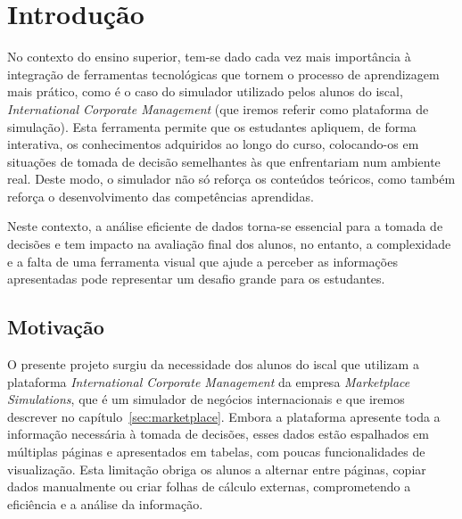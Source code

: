 

\chapter{Introdução}
\label{ch:introducao}

No contexto do ensino superior, tem-se dado cada vez mais importância à integração de ferramentas tecnológicas que tornem o processo de aprendizagem mais prático, como é o caso do simulador utilizado pelos alunos do \gls{iscal}, \textit{International Corporate Management} \cite{MarketplaceSim_2025} (que iremos referir como plataforma de simulação). Esta ferramenta permite que os estudantes apliquem, de forma interativa, os conhecimentos adquiridos ao longo do curso, colocando-os em situações de tomada de decisão semelhantes às que enfrentariam num ambiente real. Deste modo, o simulador não só reforça os conteúdos teóricos, como também reforça o desenvolvimento das competências aprendidas. 

Neste contexto, a análise eficiente de dados torna-se essencial para a tomada de decisões e tem impacto na avaliação final dos alunos, no entanto, a complexidade e a falta de uma ferramenta visual que ajude a perceber as informações apresentadas pode representar um desafio grande para os estudantes.

\section{Motivação}

O presente projeto surgiu da necessidade dos alunos do \gls{iscal} que utilizam a plataforma \textit{International Corporate Management} da empresa \textit{Marketplace Simulations}, que é um simulador de negócios internacionais e que iremos descrever no capítulo~\ref{sec:marketplace}. Embora a plataforma apresente toda a informação necessária à tomada de decisões, esses dados estão espalhados em múltiplas páginas e apresentados em tabelas, com poucas funcionalidades de visualização. Esta limitação obriga os alunos a alternar entre páginas, copiar dados manualmente ou criar folhas de cálculo externas, comprometendo a eficiência e a análise da informação.

